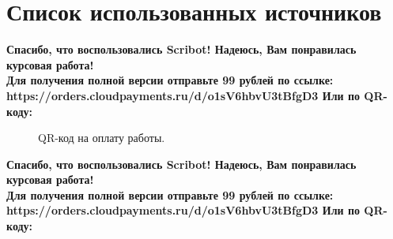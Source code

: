 \documentclass{article}
\begin{document}
\section{Список использованных источников}
\begin{center}
    \textbf{
        Спасибо, что воспользовались Scribot! Надеюсь, Вам понравилась курсовая работа!\\
        Для получения полной версии отправьте 99 рублей по ссылке:\\
        https://orders.cloudpayments.ru/d/o1sV6hbvU3tBfgD3
        Или по QR-коду:\\
    }
\end{center}
\begin{figure}[h]
    \caption{QR-код на оплату работы.}
    \label{ris:image}
\end{figure}
\newpage
\begin{center}
    \textbf{
        Спасибо, что воспользовались Scribot! Надеюсь, Вам понравилась курсовая работа!\\
        Для получения полной версии отправьте 99 рублей по ссылке:\\
        https://orders.cloudpayments.ru/d/o1sV6hbvU3tBfgD3
        Или по QR-коду:\\
    }
\end{center}
\end{document}
